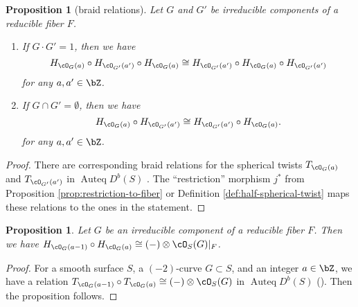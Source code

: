 \documentclass{amsart}
\numberwithin{equation}{section}
\theoremstyle{plain}
\newtheorem{proposition}[theorem]{Proposition}
\theoremstyle{definition}
\DeclareMathOperator{\Auteq}{\mathrm{Auteq}}
\begin{document}
\begin{proposition}[braid relations]\label{prop:braid-relation}
    Let $G$ and $G'$ be irreducible components of a reducible fiber $F$.
    \begin{enumerate}
        \item If $G \cdot G' = 1$, then we have
              \begin{equation}
                  H_{\cO_G(a)} \circ H_{\cO_{G'}(a')} \circ H_{\cO_G(a)} \cong H_{\cO_{G'}(a')} \circ H_{\cO_G(a)} \circ H_{\cO_{G'}(a')}
              \end{equation}
              for any $a, a' \in \bZ$.
        \item If $G \cap G' = \emptyset$, then we have
              \begin{equation}
                  H_{\cO_G(a)} \circ H_{\cO_{G'}(a')} \cong H_{\cO_{G'}(a')} \circ H_{\cO_G(a)}.
              \end{equation}
              for any $a, a' \in \bZ$.
    \end{enumerate}
\end{proposition}
\begin{proof}
    There are corresponding braid relations for the spherical twists $T_{\cO_G(a)}$ and $T_{\cO_{G'}(a')}$ in $\Auteq D^b(S)$ \cite[Example 3.5]{MR1831820}.
    The ``restriction'' morphism $j^*$ from Proposition \ref{prop:restriction-to-fiber} or Definition \ref{def:half-spherical-twist} maps these relations to the ones in the statement.
\end{proof}

\begin{proposition}\label{prop:half-spherical-twist-and-line-bundle}
    Let $G$ be an irreducible component of a reducible fiber $F$.
    Then we have
    $H_{\cO_G(a-1)} \circ H_{\cO_G(a)} \cong (-) \otimes \cO_{S}(G)\lvert_{F}$.
\end{proposition}
\begin{proof}
    For a smooth surface $S$, a $(-2)$-curve $G \subset S$, and an integer $a \in \bZ$, we have a relation $T_{\cO_G(a-1)} \circ T_{\cO_G(a)} \cong (-) \otimes \cO_{S}(G)$ in $\Auteq D^b(S)$ (\cite[Lemma 4.15 (i)(2)]{MR2198807}).
    Then the proposition follows.
\end{proof}
\end{document}
